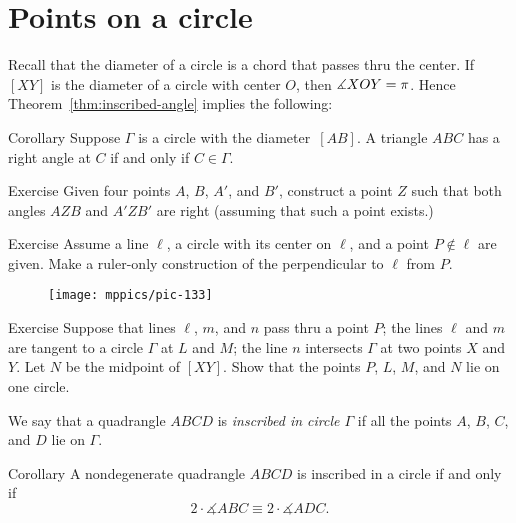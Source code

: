 \section{Points on a circle}

Recall that the diameter of a circle is a chord that passes thru the center.
If $[XY]$ is the diameter of a circle with center $O$, then $\measuredangle X O Y=\pi$. 
Hence Theorem~\ref{thm:inscribed-angle} implies the following:


\begin{thm}{Corollary}\label{cor:right-angle-diameter}
Suppose $\Gamma$ is a circle with the diameter~$[AB]$.
A triangle $ABC$ has a right angle at $C$ if and only if $C\in\Gamma$.
\end{thm}

\begin{thm}{Exercise}\label{ex:two-right}
Given four points $A$, $B$, $A'$, and $B'$,
construct a point $Z$ such that both angles $AZB$ and $A'ZB'$ are right
(assuming that such a point exists.)
\end{thm}

\begin{thm}{Exercise}\label{ex:perpendicular-ruler}
Assume a line $\ell$, 
a circle with its center on $\ell$, 
and a point $P\notin\ell$ are given.
Make a ruler-only construction of the perpendicular to $\ell$
from $P$.
\end{thm}

\begin{wrapfigure}{r}{32mm}
\vskip-4mm
\centering
\texttt{[image: mppics/pic-133]}
\end{wrapfigure}

\begin{thm}{Exercise}\label{ex:tnagents+midpoint}
Suppose that lines $\ell$, $m$, and $n$ pass thru a point $P$;
the lines $\ell$ and $m$ are tangent to a circle $\Gamma$ at $L$ and $M$;
the line $n$ intersects $\Gamma$ at two points $X$ and $Y$.
Let $N$ be the midpoint of $[XY]$.
Show that the points $P$, $L$, $M$, and $N$ lie on one circle.
\end{thm}

We say that a quadrangle $ABCD$ is 
\emph{inscribed in circle $\Gamma$}
if all the points $A$, $B$, $C$, and $D$ lie on $\Gamma$.

\begin{thm}{Corollary}\label{cor:inscribed-quadrangle}
A nondegenerate quadrangle $ABCD$ is inscribed in a circle if and only if 
\[2\cdot\measuredangle ABC\equiv 2\cdot\measuredangle ADC.\]

\end{thm}

